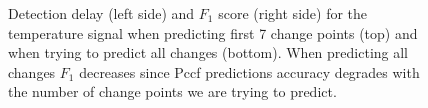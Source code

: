 \begin{figure}[!htb]
		\centering
  \caption{Detection delay (left side) and $F_1$ score (right side) for the temperature signal when predicting first 7 change points (top) and when trying to predict all changes (bottom). 
  When predicting all changes $F_1$ decreases since Pccf predictions accuracy degrades with the number of change points we are trying to predict. 
  }
	\label{fig:performance_temperature_signal}
\end{figure}

